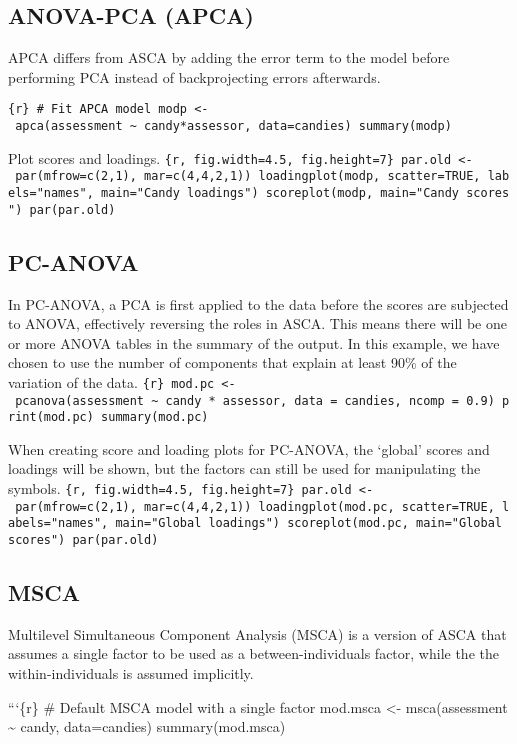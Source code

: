 \subsection{ANOVA-PCA (APCA)}\label{anova-pca-apca}

APCA differs from ASCA by adding the error term to the model before
performing PCA instead of backprojecting errors afterwards.

\texttt{\{r\}\ \#\ Fit\ APCA\ model\ modp\ \textless{}-\ apca(assessment\ \textasciitilde{}\ candy*assessor,\ data=candies)\ summary(modp)}

Plot scores and loadings.
\texttt{\{r,\ fig.width=4.5,\ fig.height=7\}\ par.old\ \textless{}-\ par(mfrow=c(2,1),\ mar=c(4,4,2,1))\ loadingplot(modp,\ scatter=TRUE,\ labels="names",\ main="Candy\ loadings")\ scoreplot(modp,\ main="Candy\ scores")\ par(par.old)}

\subsection{PC-ANOVA}\label{pc-anova}

In PC-ANOVA, a PCA is first applied to the data before the scores are
subjected to ANOVA, effectively reversing the roles in ASCA. This means
there will be one or more ANOVA tables in the summary of the output. In
this example, we have chosen to use the number of components that
explain at least 90\% of the variation of the data.
\texttt{\{r\}\ mod.pc\ \textless{}-\ pcanova(assessment\ \textasciitilde{}\ candy\ *\ assessor,\ data\ =\ candies,\ ncomp\ =\ 0.9)\ print(mod.pc)\ summary(mod.pc)}

When creating score and loading plots for PC-ANOVA, the `global' scores
and loadings will be shown, but the factors can still be used for
manipulating the symbols.
\texttt{\{r,\ fig.width=4.5,\ fig.height=7\}\ par.old\ \textless{}-\ par(mfrow=c(2,1),\ mar=c(4,4,2,1))\ loadingplot(mod.pc,\ scatter=TRUE,\ labels="names",\ main="Global\ loadings")\ scoreplot(mod.pc,\ main="Global\ scores")\ par(par.old)}

\subsection{MSCA}\label{msca}

Multilevel Simultaneous Component Analysis (MSCA) is a version of ASCA
that assumes a single factor to be used as a between-individuals factor,
while the the within-individuals is assumed implicitly.

```\{r\} \# Default MSCA model with a single factor mod.msca \textless-
msca(assessment \textasciitilde{} candy, data=candies) summary(mod.msca)

